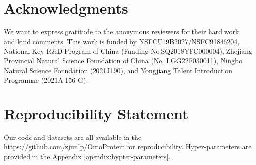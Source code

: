 \section*{Acknowledgments}
We  want to express gratitude to the anonymous reviewers for their hard work and kind comments. This work is funded by NSFCU19B2027/NSFC91846204, National Key R\&D Program of China (Funding No.SQ2018YFC000004), Zhejiang Provincial Natural Science Foundation of China (No. LGG22F030011), Ningbo Natural Science Foundation (2021J190), and Yongjiang Talent Introduction Programme (2021A-156-G). 

\section*{Reproducibility Statement}
Our code and datasets are all available in the \url{https://github.com/zjunlp/OntoProtein} for reproducibility.
Hyper-parameters are provided in the Appendix \ref{apendix:hypter-parameters}.

